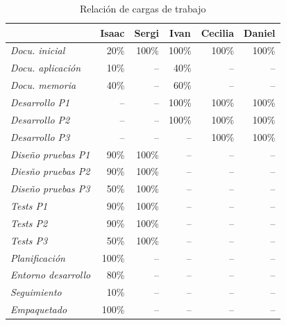 \documentclass[a4paper,12pt,titlepage]{article}
\begin{document}
\begin{table}
\begin{center}
\begin{tabular}{|l|r|r|r|r|r|}
\hline
& \multicolumn{1}{c|}{\textbf{Isaac}}
& \multicolumn{1}{c|}{\textbf{Sergi}}
& \multicolumn{1}{c|}{\textbf{Ivan}}
& \multicolumn{1}{c|}{\textbf{Cecilia}}
& \multicolumn{1}{c|}{\textbf{Daniel}} \\
\hline
\hline
\emph{Docu. inicial} & 20\% & 100\% & 100\% & 100\% & 100\% \\
\hline
\emph{Docu. aplicación} & 10\% & -- & 40\% & -- & -- \\
\hline
\emph{Docu. memoria} & 40\% & -- & 60\% & -- & -- \\
\hline
\hline
\emph{Desarrollo P1} & -- & -- & 100\% & 100\% & 100\% \\
\hline
\emph{Desarrollo P2} & -- & -- & 100\% & 100\% & 100\% \\
\hline
\emph{Desarrollo P3} & -- & -- & -- & 100\% & 100\% \\
\hline
\hline
\emph{Diseño pruebas P1} & 90\% & 100\% & -- & -- & -- \\
\hline
\emph{Diesño pruebas P2} & 90\% & 100\% & -- & -- & -- \\
\hline
\emph{Diseño pruebas P3} & 50\% & 100\% & -- & -- & -- \\
\hline
\emph{Tests P1} & 90\% & 100\% & -- & -- & -- \\
\hline
\emph{Tests P2} & 90\% & 100\% & -- & -- & -- \\
\hline
\emph{Tests P3} & 50\% & 100\% & -- & -- & -- \\
\hline
\hline
\emph{Planificación} & 100\% & -- & -- & -- & -- \\
\hline
\emph{Entorno desarrollo} & 80\% & -- & -- & -- & -- \\
\hline
\emph{Seguimiento} & 10\% & -- & -- & -- & -- \\
\hline
\emph{Empaquetado} & 100\% & -- & -- & -- & -- \\
\hline
\end{tabular}
\caption{Relación de cargas de trabajo}\label{cargas2}
\end{center}
\end{table}
\end{document}
